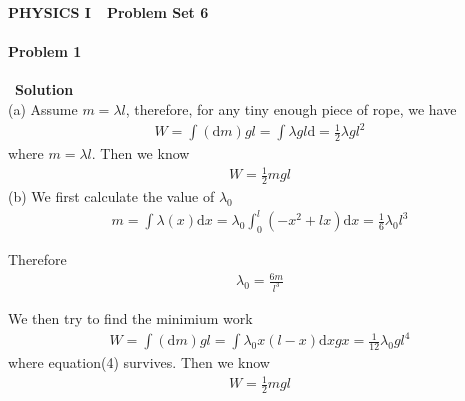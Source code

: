 \documentclass[12pt,a4paper]{article}
\begin{document}
\centerline{\Huge{{\textbf{PHYSICS I\ \ Problem Set 6}}}}
\vspace{0.5cm}
\paragraph{\large \textbf{Problem 1}}~{\textbf{Solution}}
\vspace{2mm}\\
\noindent (a) Assume $m=\lambda l$, therefore, for any tiny enough piece of rope, we have
\begin{align}
	W = \int (\text{d}m) gl = \int \lambda gl \text{d} = \frac{1}{2}\lambda gl^2
\end{align}
\noindent where $m=\lambda l$. Then we know
\begin{align}
	W =  \frac{1}{2}mgl
\end{align}
\noindent (b) We first calculate the value of $\lambda_0$
\begin{align}
	m = \int \lambda(x) \text{d}x = \lambda_0 \int_0^l (-x^2+lx)\text{d}x = \frac{1}{6}\lambda_0 l^3
\end{align}
\par Therefore
\begin{align}
	\lambda_0 = \frac{6m}{l^3}
\end{align}
\par We then try to find the minimium work
\begin{align}
	W = \int (\text{d}m) gl = \int \lambda_0 x(l-x)\text{d}x gx = \frac{1}{12}\lambda_0 gl^4
\end{align}
\noindent where equation(4) survives. Then we know
\begin{align}
	W = \frac{1}{2}mgl
\end{align}
\end{document}
